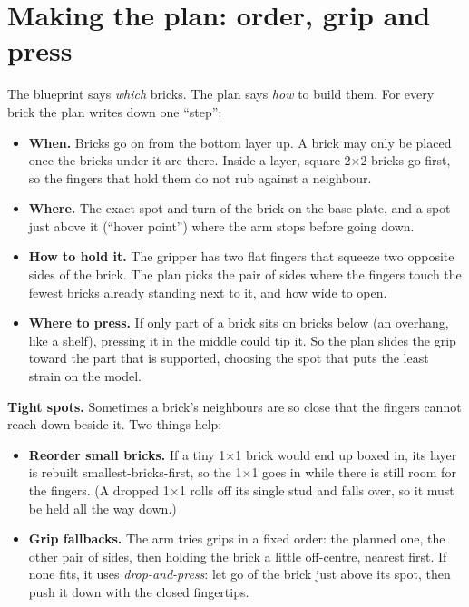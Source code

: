 \documentclass[11pt,a4paper]{article}
\begin{document}
\section{Making the plan: order, grip and press}

The blueprint says \emph{which} bricks. The plan says \emph{how} to build them.
For every brick the plan writes down one ``step'':

\begin{itemize}
\item \textbf{When.} Bricks go on from the bottom layer up. A brick may only be
      placed once the bricks under it are there. Inside a layer, square
      2$\times$2 bricks go first, so the fingers that hold them do not rub
      against a neighbour.
\item \textbf{Where.} The exact spot and turn of the brick on the base plate,
      and a spot just above it (``hover point'') where the arm stops before going
      down.
\item \textbf{How to hold it.} The gripper has two flat fingers that squeeze two
      opposite sides of the brick. The plan picks the pair of sides where the
      fingers touch the fewest bricks already standing next to it, and how wide
      to open.
\item \textbf{Where to press.} If only part of a brick sits on bricks below (an
      overhang, like a shelf), pressing it in the middle could tip it. So the plan
      slides the grip toward the part that is supported, choosing the spot that
      puts the least strain on the model.
\end{itemize}

\textbf{Tight spots.} Sometimes a brick's neighbours are so close that the
fingers cannot reach down beside it. Two things help:
\begin{itemize}
\item \textbf{Reorder small bricks.} If a tiny 1$\times$1 brick would end up boxed
      in, its layer is rebuilt smallest-bricks-first, so the 1$\times$1 goes in
      while there is still room for the fingers. (A dropped 1$\times$1 rolls off
      its single stud and falls over, so it must be held all the way down.)
\item \textbf{Grip fallbacks.} The arm tries grips in a fixed order: the planned
      one, the other pair of sides, then holding the brick a little off-centre,
      nearest first. If none fits, it uses \emph{drop-and-press}: let go of the
      brick just above its spot, then push it down with the closed fingertips.
\end{itemize}
\end{document}
